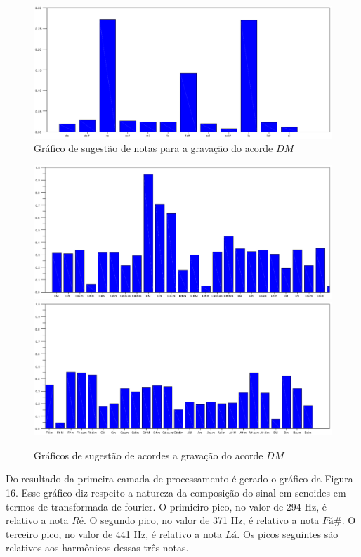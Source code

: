 \begin{figure}[h]
	\centering
		\includegraphics[keepaspectratio=true,scale=0.49]{figuras/Dm/notas_DM.eps}
	\caption{Gráfico de sugestão de notas para a gravação do acorde $DM$}
\end{figure}

\begin{figure}[h]
	\centering
		\includegraphics[keepaspectratio=true,scale=0.45]{figuras/Dm/acordes_1_DM.eps}
		\includegraphics[keepaspectratio=true,scale=0.45]{figuras/Dm/acordes_2_DM.eps}
	\caption{Gráficos de sugestão de acordes a gravação do acorde $DM$}
\end{figure}
\newpage
Do resultado da primeira camada de processamento é gerado o gráfico da Figura 16. Esse gráfico diz respeito a natureza da composição do sinal em senoides em termos de transformada de fourier. O primieiro pico, no valor de 294 Hz, é relativo a nota $Ré$. O segundo pico, no valor de 371 Hz, é relativo a nota $Fá\#$. O terceiro pico, no valor de 441 Hz, é relativo a nota $Lá$. Os picos seguintes são relativos aos harmônicos dessas três notas. 


